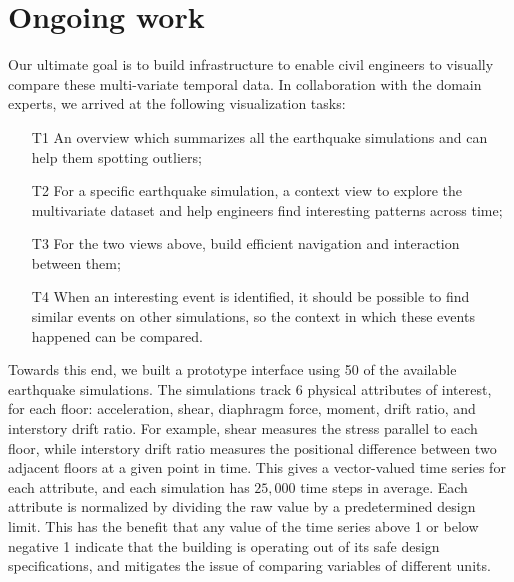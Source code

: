 \section{Ongoing work} %
\label{sec:vis}

Our ultimate goal is to build infrastructure to enable civil engineers to visually compare these multi-variate temporal data. In collaboration with the domain experts, we arrived at the following visualization tasks:
\begin{itemize}
	\item [T1] An overview which summarizes all the earthquake simulations and can help them spotting outliers;
	\item [T2] For a specific earthquake simulation, a context view to explore the multivariate dataset and help engineers find interesting patterns across time;
	\item [T3] For the two views above, build efficient navigation and interaction between them;
        \item [T4] When an interesting event is identified, it should be possible to find similar events on other simulations, so the context in which these events happened can be compared.
\end{itemize} 



Towards this end, we built a prototype interface using 50 of the available earthquake simulations.
The simulations track 6 physical attributes of interest, for each floor: acceleration, shear, diaphragm force, moment, drift ratio, and interstory drift ratio. For example, shear measures the stress parallel to each floor, while interstory drift ratio measures the positional difference between two adjacent floors at a given point in time. 
This gives a vector-valued time series for each attribute, and each simulation has $25,000$ time steps in average.
Each attribute is normalized by dividing the raw value by a predetermined design limit. This has the benefit that any value of the time series above 1 or below negative 1 indicate that the building is operating out of its safe design specifications, and mitigates the issue of comparing variables of different units.

